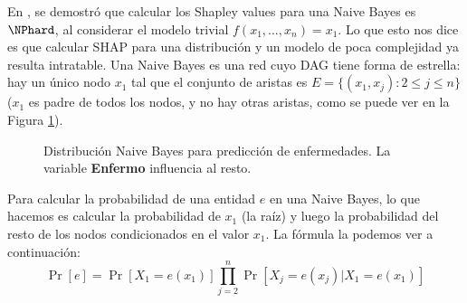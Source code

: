 En \cite{van2022tractability}, se demostró que calcular los Shapley values para una Naive Bayes es \(\NPhard\), al considerar el modelo trivial \(f(x_1,\ldots,x_n) = x_1\). Lo que esto nos dice es que calcular SHAP para una distribución y un modelo de poca complejidad ya resulta intratable. Una Naive Bayes es una red cuyo DAG tiene forma de estrella:  hay un único nodo \(x_1\) tal que el conjunto de aristas es \(E = \{(x_1, x_j) : 2 \leq j \leq n\}\) (\(x_1\) es padre de todos los nodos, y no hay otras aristas, como se puede ver en la Figura \ref{fig:naiveBayesExample}).  

\begin{figure}[ht]
    \centering
    \caption{Distribución Naive Bayes para predicción de enfermedades. La variable \textbf{Enfermo} influencia al resto.}
    \label{fig:naiveBayesExample}
\end{figure}


Para calcular la probabilidad de una entidad \(e\) en una Naive Bayes, lo que hacemos es calcular la probabilidad de $x_1$ (la raíz) y luego la probabilidad del resto de los nodos condicionados en el valor $x_1$. La fórmula la podemos ver a continuación:
\[
\Pr[e] = \Pr[X_1 = e(x_1)] \prod_{j=2}^n \Pr[X_j = e(x_j) | X_1 = e(x_1)]
\]

